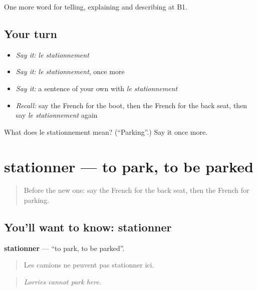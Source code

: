 \begin{grammarlens}[title={What you've built}]
One more word for telling, explaining and describing at B1.
\end{grammarlens}

\subsection*{Your turn}
\begin{itemize}
\raggedright
  \item \emph{Say it:} \emph{le stationnement}
  \item \emph{Say it:} \emph{le stationnement}, once more
  \item \emph{Say it:} a sentence of your own with \emph{le stationnement}
  \item \emph{Recall:} say the French for the boot, then the French for the back seat, then say \emph{le stationnement} again
\end{itemize}

\begin{tcolorbox}[breakable,colback=teal!4,colframe=teal!35!black,title={Before you move on}]
What does le stationnement mean? (\textquotedblleft{}Parking\textquotedblright{}.) Say it once more.
\end{tcolorbox}
\section[stationner]{stationner — to park, to be parked}

\label{lesson:FR-C407-stationner}



\begin{quote}
Before the new one: say the French for the back seat, then the French for parking.
\end{quote}

\subsection*{You'll want to know: stationner}
\textbf{stationner} — \textquotedblleft{}to park, to be parked\textquotedblright{}.

\begin{quote}
Les camions ne peuvent pas stationner ici.
\end{quote}

\begin{quote}
\emph{Lorries cannot park here.}
\end{quote}

